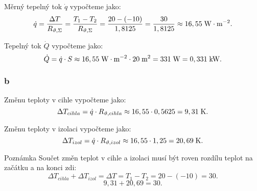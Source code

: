 \documentclass{article}
\begin{document}
Měrný tepelný tok $\dot{q}$ vypočteme jako:
$$
    \dot{q} = \frac{\Delta T}{R_{\vartheta,\Sigma}} = \frac{T_1 - T_2}{R_{\vartheta,\Sigma}} = \frac{20 - (-10)}{1,8125} = \frac{30}{1,8125} \approx 16,55 \; \textrm{W} \cdot \textrm{m}^{-2}.
$$

Tepelný tok $\dot{Q}$ vypočteme jako:
$$
    \dot{Q} = \dot{q} \cdot S \approx 16,55 \; \textrm{W} \cdot \textrm{m}^{-2} \cdot 20 \; \textrm{m}^{\textrm{2}} = 331 \; \textrm{W} = 0,331 \; \textrm{kW}.
$$


\subsubsection{b}
Změnu teploty v cihle vypočteme jako:
$$
    \Delta T_{cihla} = \dot{q} \cdot R_{\vartheta,cihla} \approx 16,55 \cdot 0,5625 = 9,31 \; \textrm{K}.
$$

Změnu teploty v izolaci vypočteme jako:
$$
    \Delta T_{izol} = \dot{q} \cdot R_{\vartheta,izol} \approx 16,55 \cdot 1,25 = 20,69 \; \textrm{K}.
$$

\begin{notebox}{Poznámka}
    Součet změn teplot v cihle a izolaci musí být roven rozdílu teplot na začátku a na konci zdi:
    $$
        \Delta T_{cihla} + \Delta T_{izol} = \Delta T = T_1 - T_2 = 20 - (-10) = 30.
    $$
    $$
        9,31 + 20,69 = 30.
    $$
\end{notebox}
\end{document}

